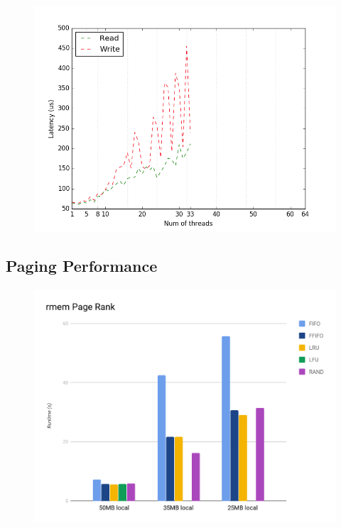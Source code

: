 \begin{figure}[H]
    \includegraphics[width=\columnwidth]{fig/latencyVsManyThreads}
    \caption{}
    \label{fig:latenctVsManyThreads}
\end{figure}

\subsection{Paging Performance}

\begin{figure}[H]
    \includegraphics[width=\columnwidth]{fig/policyPerformance}
    \caption{}
    \label{fig:policyPerformance}
\end{figure}

